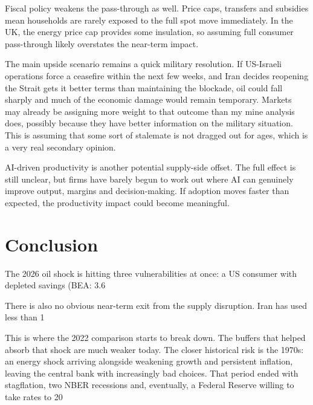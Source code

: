 \documentclass[12pt,a4paper]{article}
\begin{document}
Fiscal policy weakens the pass-through as well. Price caps, transfers and subsidies mean households are rarely exposed to the full spot move immediately. In the UK, the energy price cap provides some insulation, so assuming full consumer pass-through likely overstates the near-term impact.

The main upside scenario remains a quick military resolution. If US-Israeli operations force a ceasefire within the next few weeks, and Iran decides reopening the Strait gets it better terms than maintaining the blockade, oil could fall sharply and much of the economic damage would remain temporary. Markets may already be assigning more weight to that outcome than my mine analysis does, possibly because they have better information on the military situation. This is assuming that some sort of stalemate is not dragged out for ages, which is a very real secondary opinion. 

AI-driven productivity is another potential supply-side offset. The full effect is still unclear, but firms have barely begun to work out where AI can genuinely improve output, margins and decision-making. If adoption moves faster than expected, the productivity impact could become meaningful.


\section{Conclusion}

The 2026 oil shock is hitting three vulnerabilities at once: a US consumer with depleted savings (BEA: 3.6%

There is also no obvious near-term exit from the supply disruption. Iran has used less than 1%

This is where the 2022 comparison starts to break down. The buffers that helped absorb that shock are much weaker today. The closer historical risk is the 1970s: an energy shock arriving alongside weakening growth and persistent inflation, leaving the central bank with increasingly bad choices. That period ended with stagflation, two NBER recessions and, eventually, a Federal Reserve willing to take rates to 20%
\end{document}
